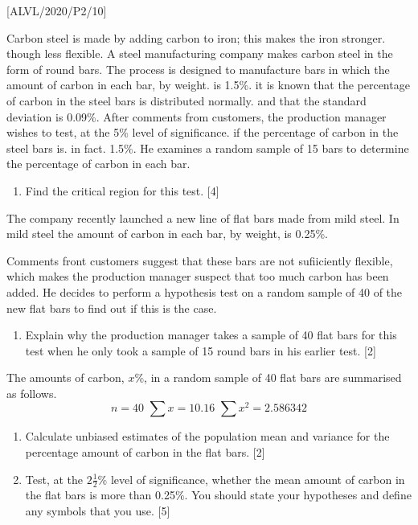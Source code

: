 \item {[}ALVL/2020/P2/10{]}

Carbon steel is made by adding carbon to iron; this makes the iron
stronger. though less flexible. A steel manufacturing company makes
carbon steel in the form of round bars. The process is designed to
manufacture bars in which the amount of carbon in each bar, by weight.
is 1.5\%. it is known that the percentage of carbon in the steel bars
is distributed normally. and that the standard deviation is 0.09\%.
After comments from customers, the production manager wishes to test,
at the 5\% level of significance. if the percentage of carbon in the
steel bars is. in fact. 1.5\%. He examines a random sample of 15 bars
to determine the percentage of carbon in each bar.
\begin{enumerate}
\item Find the critical region for this test. \hfill{}{[}4{]}
\end{enumerate}
The company recently launched a new line of flat bars made from mild
steel. In mild steel the amount of carbon in each bar, by weight,
is 0.25\%.

Comments front customers suggest that these bars are not sufiiciently
flexible, which makes the production manager suspect that too much
carbon has been added. He decides to perform a hypothesis test on
a random sample of 40 of the new flat bars to find out if this is
the case. 
\begin{enumerate}
\item Explain why the production manager takes a sample of 40 flat bars
for this test when he only took a sample of 15 round bars in his earlier
test.\hfill{} {[}2{]}
\end{enumerate}
The amounts of carbon, $x$\%, in a random sample of 40 flat bars
are summarised as follows. 
\[
n=40\,\,\sum x=10.16\,\,\sum x^{2}=2.586342
\]

\begin{enumerate}
\item Calculate unbiased estimates of the population mean and variance for
the percentage amount of carbon in the flat bars. \hfill{}{[}2{]}
\item Test, at the $2\frac{1}{2}$\% level of significance, whether the
mean amount of carbon in the flat bars is more than 0.25\%. You should
state your hypotheses and define any symbols that you use. \hfill{}{[}5{]}
\end{enumerate}
